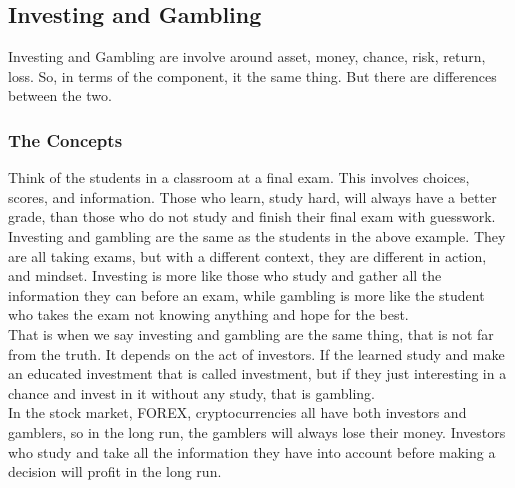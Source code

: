 \documentclass{article}
\begin{document}
\subsection{Investing and Gambling}
Investing and Gambling are involve around asset, money, chance, risk, return, loss.  So, in terms of the component, it the same thing.  But there are differences between the two.  \\
\subsubsection{The Concepts}
Think of the students in a classroom at a final exam.  This involves choices, scores, and information. Those who learn, study hard, will always have a better grade, than those who do not study and finish their final exam with guesswork.\\

Investing and gambling are the same as the students in the above example.  They are all taking exams, but with a different context, they are different in action, and mindset.  Investing is more like those who study and gather all the information they can before an exam, while gambling is more like the student who takes the exam not knowing anything and hope for the best.\\

That is when we say investing and gambling are the same thing, that is not far from the truth.  It depends on the act of investors.  If the learned  study and make an educated investment that is called investment, but if they just interesting in a chance and invest in it without any study, that is gambling.\\

In the stock market, FOREX, cryptocurrencies all have both investors and gamblers, so in the long run, the gamblers will always lose their money.  Investors who study and take all the information they have into account before making a decision will profit in the long run.\\
\end{document}
